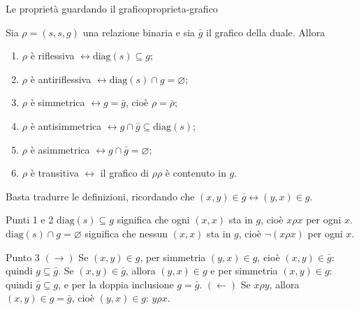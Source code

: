 \begin{concetto}
\begin{Proposizione}{Le proprietà guardando il grafico}{proprieta-grafico}
    \begin{prerequisiti}
    \end{prerequisiti}
    Sia $\rho = (s, s, g)$ una relazione binaria e sia $\bar{g}$ il grafico della duale. Allora
    \begin{enumerate}
        \item $\rho$ è riflessiva $\leftrightarrow \mathrm{diag}(s) \subseteq g$;
        \item $\rho$ è antiriflessiva $\leftrightarrow \mathrm{diag}(s) \cap g = \varnothing$;
        \item $\rho$ è simmetrica $\leftrightarrow g = \bar{g}$, cioè $\rho = \bar{\rho}$;
        \item $\rho$ è antisimmetrica $\leftrightarrow g \cap \bar{g} \subseteq \mathrm{diag}(s)$;
        \item $\rho$ è asimmetrica $\leftrightarrow g \cap \bar{g} = \varnothing$;
        \item $\rho$ è transitiva $\leftrightarrow$ il grafico di $\rho\rho$ è contenuto in $g$.
    \end{enumerate}
\end{Proposizione}
\begin{dimostrazione}
    Basta tradurre le definizioni, ricordando che $(x, y) \in \bar{g} \leftrightarrow (y, x) \in g$.
    \begin{caso}{Punti 1 e 2}
        $\mathrm{diag}(s) \subseteq g$ significa che ogni $(x, x)$ sta in $g$, cioè $x \rho x$ per ogni $x$. $\mathrm{diag}(s) \cap g = \varnothing$
        significa che nessun $(x, x)$ sta in $g$, cioè $\neg(x \rho x)$ per ogni $x$.
    \end{caso}
    \begin{caso}{Punto 3}
        $(\rightarrow)$ Se $(x, y) \in g$, per simmetria $(y, x) \in g$, cioè $(x, y) \in \bar{g}$: quindi $g \subseteq \bar{g}$. Se
        $(x, y) \in \bar{g}$, allora $(y, x) \in g$ e per simmetria $(x, y) \in g$: quindi $\bar{g} \subseteq g$, e per la doppia
        inclusione $g = \bar{g}$. $(\leftarrow)$ Se $x \rho y$, allora $(x, y) \in g = \bar{g}$, cioè $(y, x) \in g$: $y \rho x$.
    \end{caso}

\end{dimostrazione}
\end{concetto}
